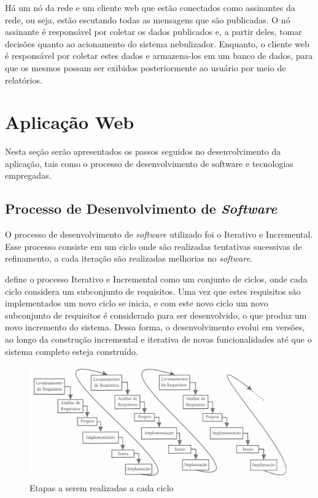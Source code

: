 Há um nó da rede e um cliente web que estão conectados como assinantes da rede, ou seja, estão escutando todas as mensagens que são publicadas. O nó assinante é responsável por coletar os dados publicados e, a partir deles, tomar decisões quanto ao acionamento do sistema nebulizador. Enquanto, o cliente web é responsável por coletar estes dados e armazena-los em um banco de dados, para que os mesmos possam ser exibidos posteriormente ao usuário por meio de relatórios.


\section{Aplicação Web}
Nesta seção serão apresentados os passos seguidos no desenvolvimento da aplicação, tais como o processo de desenvolvimento de software e tecnologias empregadas.

\subsection{Processo de Desenvolvimento de \textit{Software}} 
O processo de desenvolvimento de \textit{software} utilizado foi o Iterativo e Incremental. Esse processo consiste em um ciclo onde são realizadas tentativas sucessivas de refinamento, a cada iteração são realizadas melhorias no \textit{software}.

 define o processo Iterativo e Incremental como um conjunto de ciclos, onde cada ciclo considera um subconjunto de requisitos. Uma vez que estes requisitos são implementados um novo ciclo se inicia, e com este novo ciclo um novo subconjunto de requisitos é considerado para ser desenvolvido, o que produz um novo incremento do sistema. Dessa forma, o desenvolvimento evolui em versões, ao longo da construção incremental e iterativa de novas funcionalidades até que o sistema completo esteja construído.

\begin{figure}[H]
    \centering
    \includegraphics[scale=0.7]{04-figuras/iterativo-incremental.png}
    \caption{Etapas a serem realizadas a cada ciclo}
    \vspace{-\baselineskip}
    \label{fig:iterativo-incremental}
\end{figure}

